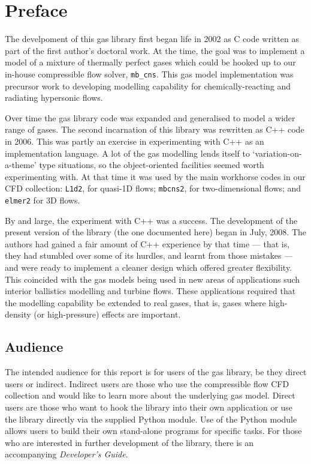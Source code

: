 \chapter*{Preface}

The develpoment of this gas library first began life in 2002
as C code written as part of the first author's doctoral work.
At the time, the goal was to implement a model of a mixture
of thermally perfect gases which could be hooked up to
our in-house compressible flow solver, \texttt{mb\_cns}.
This gas model implementation was precursor work to
developing modelling capability for chemically-reacting
and radiating hypersonic flows.

Over time the gas library code was expanded and generalised
to model a wider range of gases.
The second incarnation of this library was rewritten as
C++ code in 2006.
This was partly an exercise in experimenting with C++
as an implementation language.
A lot of the gas modelling lends itself to `variation-on-a-theme'
type situations, so the object-oriented facilities seemed
worth experimenting with.
At that time it was used by the main workhorse codes in our
CFD collection: \texttt{L1d2}, for quasi-1D flows;
\texttt{mbcns2}, for two-dimensional flows; and \texttt{elmer2}
for 3D flows.

By and large, the experiment with C++ was a success.
The development of the present version of the library
(the one documented here) began in July, 2008.
The authors had gained a fair amount of C++ experience by that
time --- that is, they had stumbled over some of its hurdles, and learnt
from those mistakes --- and were ready to implement a cleaner design
which offered greater flexibility.
This coincided with the gas models being used in new areas of applications
such interior ballistics modelling and turbine flows.
These applications required that the modelling capability
be extended to real gases, that is, gases where high-density (or high-pressure) effects are important.

\section*{Audience}
The intended audience for this report is for users of the gas library, 
be they direct users or indirect.
Indirect users are those who use the compressible flow CFD collection
and would like to learn more about the underlying gas model.
Direct users are those who want to hook the library into their
own application or use the library directly via the supplied Python
module.
Use of the Python module allows users to build their own stand-alone
programs for specific tasks.
For those who are interested in further development of the library,
there is an accompanying \textit{Developer's Guide}.

